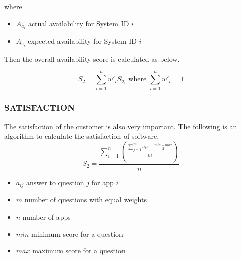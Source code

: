 \documentclass[SDSUThesis.tex]{subfiles}
\begin{document}
                where
                
                \begin{itemize}
                    \item $A_{a_i}$ actual availability for System ID $i$
                    \item $A_{e_i}$ expected availability for System ID $i$
                \end{itemize}
                
                Then the overall availability score is calculated as below.
                
                \[
                    S_{2} = \sum\limits^n_{i=1} w'_i S_{2_i} \text{ where } \sum\limits^n_{i=1} w'_i = 1
                \]
                
        \subsubsection{SATISFACTION}
            The satisfaction of the customer is also very important.  
            The following is an algorithm to calculate the satisfaction of software.
            \[
                S_2 = \frac{\sum^n_{i=1}\left( \frac{\sum^m_{j=1}a_{ij}- \frac{min + max}{2}}{m}  \right)}{n}
            \]
            
            \begin{itemize}
            \item $a_{i j}$ answer to question $j$ for app $i$
            \item $m$ number of questions with equal weights
            \item $n$ number of apps
            \item $min$ minimum score for a question
            \item $max$ maximum score for a question
            \end{itemize}
            
\end{document}
